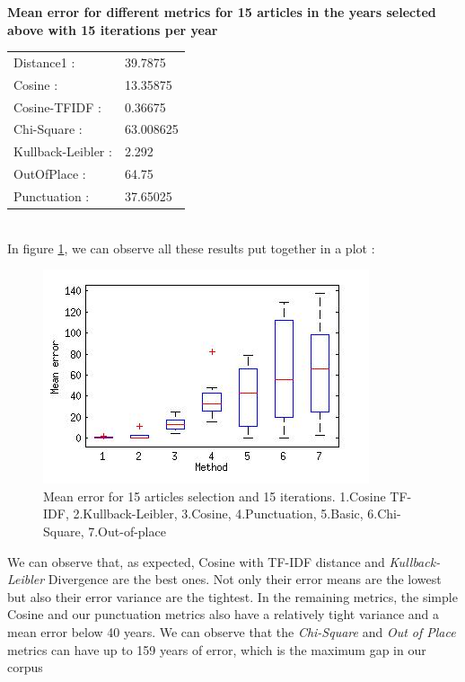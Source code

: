 \newpage{}
\textbf{Mean error for different metrics for 15 articles in the years selected above with 15 iterations per year}\\
\begin{tabular}{p{3cm} p{5cm}}
    Distance1 :& 39.7875\\
    Cosine :& 13.35875\\
    Cosine-TFIDF :& 0.36675\\
    Chi-Square :& 63.008625\\
    Kullback-Leibler :& 2.292\\
    OutOfPlace :& 64.75\\
    Punctuation :& 37.65025\\
\end{tabular}\\

In figure \ref{date_cv}, we can observe all these results put together in a plot :

\begin{figure}[H]
	\centering
	\includegraphics[scale=0.70]{Pictures/date_articles/date_corpus.jpg}
        \caption{Mean error for 15 articles selection and 15 iterations. 1.Cosine TF-IDF, 2.Kullback-Leibler, 3.Cosine, 4.Punctuation, 5.Basic, 6.Chi-Square, 7.Out-of-place}
        \label{date_cv}
\end{figure}

We can observe that, as expected, Cosine with TF-IDF distance and \emph{Kullback-Leibler} Divergence are the best ones. Not only their error means are the lowest but also their error variance are the tightest. In the remaining metrics, the simple Cosine and our punctuation metrics also have a relatively tight variance and a mean error below 40 years. We can observe that the \emph{Chi-Square} and \emph{Out of Place} metrics can have up to 159 years of error, which is the maximum gap in our corpus\\

